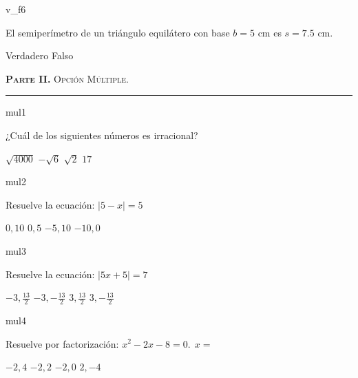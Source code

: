 \documentclass[a4paper]{article}
\begin{document}
\begin{question}{v_f6}

El semiperímetro de un triángulo equilátero con base \(b=5\) cm es \(s= 7.5 \) cm. 

\begin{choices}
    \choice Verdadero
    \choice Falso
\end{choices}
 
\end{question}
 
\parbox{6in}{\textsc{\textbf{Parte II.} Opción Múltiple.}}

\hrule


\begin{question}{mul1}

¿Cuál de los siguientes números es irracional? 

\begin{choices}
        \choice  $\sqrt{4000} $
        \choice  $-\sqrt{6}$ 
        \choice  $\sqrt{2}$ 
        \choice  $17$
        \end{choices}

\end{question}

\begin{question}{mul2}

Resuelve la ecuación: \( \left|  5-x  \right| =5\)

    \begin{choices}
            \choice $0, 10$
            \choice $0, 5$
            \choice $-5, 10$
            \choice $-10, 0$
    \end{choices}
    
\end{question}

\begin{question}{mul3}

    Resuelve la ecuación: \(\left| 5x+5 \right|= 7 \)
    
    \begin{choices}
            \choice $-3, {\frac{13}{2}}$
            \choice $-3, {-\frac{13}{2}}$
            \choice $3, {\frac{13}{2}}$
            \choice $3, {-\frac{13}{2}}$
    \end{choices}
    
\end{question}

\begin{question}{mul4}

     Resuelve por factorización:  \(x^2 - 2 x - 8  =0. \  \ x = \)
     
        \begin{choices}
            \choice \(-2, 4\)
            \choice \( -2, 2\)
            \choice \(-2, 0 \)
            \choice \(2, -4\)
        \end{choices}

\end{question}
\end{document}
